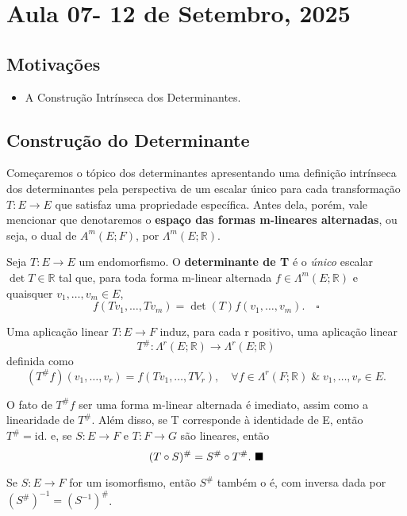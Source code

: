 \documentclass[../differential_forms.tex]{subfiles}
\begin{document}
\section{Aula 07- 12 de Setembro, 2025}
\subsection{Motivações}
\begin{itemize}
	\item A Construção Intrínseca dos Determinantes.
\end{itemize}
\subsection{Construção do Determinante}
Começaremos o tópico dos determinantes apresentando uma definição intrínseca dos determinantes pela perspectiva de um escalar único para cada transformação \(T:E\rightarrow E\) que satisfaz uma propriedade específica. Antes dela, porém, vale mencionar que denotaremos o \textbf{espaço das formas m-lineares alternadas}, ou seja, o dual de \(A^{m}(E; F)\), por \(\Lambda^{m}(E; \mathbb{R})\).
\begin{def*}
	Seja \(T:E\rightarrow E\) um endomorfismo. O \textbf{determinante de T} é o \textit{único} escalar \(\det{T}\in \mathbb{R}\) tal que, para toda forma m-linear alternada \(f\in \Lambda^{m}(E; \mathbb{R})\) e quaisquer \(v_1,\dotsc , v_{m}\in E\),
	\[
		f(Tv_1,\dotsc , Tv_{m}) = \det{(T)} f(v_1,\dotsc ,v_{m}). \quad \square
	\]
\end{def*}
\begin{prop*}
	Uma aplicação linear \(T:E\rightarrow F\) induz, para cada r positivo, uma aplicação linear
	\[
		T^{\#}: \Lambda^{r}(E; \mathbb{R})\rightarrow \Lambda^{r}(E; \mathbb{R})
	\]
	definida como
	\[
		(T^{\#}f)(v_1,\dotsc ,v_r)= f(Tv_1,\dotsc ,TV_r),\quad \forall f\in \Lambda ^{r}(F; \mathbb{R})\;\&\; v_1,\dotsc ,v_r\in E.
	\]
\end{prop*}
\begin{proof*}
	O fato de \(T^{\#}f\) ser uma forma m-linear alternada é imediato, assim como a linearidade de \(T^{\#}.\) Além disso, se T corresponde à identidade de E, então \(T^{\#}=\mathrm{id}.\) e, se \(S:E\rightarrow F\) e \(T:F\rightarrow G\) são lineares, então
	\[
		(T \circ S)^{\#}=S^{\#}\circ T^{\#}.\text{ $\blacksquare$}
	\]
\end{proof*}
\begin{crl*}
	Se \(S:E\rightarrow F\) for um isomorfismo, então \(S^{\#}\) também o é, com inversa dada por \((S^{\#})^{-1}=(S^{-1})^{\#}\).
\end{crl*}
\end{document}
